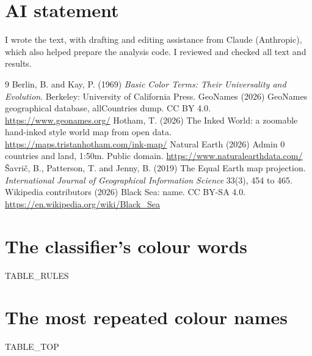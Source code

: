 \documentclass[11pt,a4paper]{article}
\begin{document}
\section*{AI statement}
I wrote the text, with drafting and editing assistance from Claude (Anthropic), which also helped prepare the analysis code. I reviewed and checked all text and results.

\begin{thebibliography}{9}
 Berlin, B. and Kay, P. (1969) \textit{Basic Color Terms: Their Universality and Evolution}. Berkeley: University of California Press.
 GeoNames (2026) GeoNames geographical database, allCountries dump. CC BY 4.0. \url{https://www.geonames.org/}
 Hotham, T. (2026) The Inked World: a zoomable hand-inked style world map from open data. \url{https://maps.tristanhotham.com/ink-map/}
 Natural Earth (2026) Admin 0 countries and land, 1:50m. Public domain. \url{https://www.naturalearthdata.com/}
 \v{S}avri\v{c}, B., Patterson, T. and Jenny, B. (2019) The Equal Earth map projection. \textit{International Journal of Geographical Information Science} 33(3), 454 to 465.
 Wikipedia contributors (2026) Black Sea: name. CC BY-SA 4.0. \url{https://en.wikipedia.org/wiki/Black_Sea}
\end{thebibliography}

\clearpage
\appendix
\section{The classifier's colour words}
{{TABLE_RULES}}

\section{The most repeated colour names}
{{TABLE_TOP}}
\end{document}
